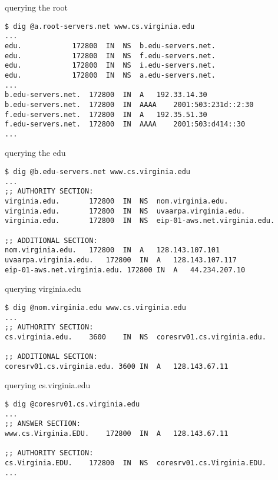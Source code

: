 
\begin{frame}[fragile]{querying the root}
\begin{Verbatim}[fontsize=\small]
$ dig @a.root-servers.net www.cs.virginia.edu
...
edu.			172800	IN	NS	b.edu-servers.net.
edu.			172800	IN	NS	f.edu-servers.net.
edu.			172800	IN	NS	i.edu-servers.net.
edu.			172800	IN	NS	a.edu-servers.net.
...
b.edu-servers.net.	172800	IN	A	192.33.14.30
b.edu-servers.net.	172800	IN	AAAA	2001:503:231d::2:30
f.edu-servers.net.	172800	IN	A	192.35.51.30
f.edu-servers.net.	172800	IN	AAAA	2001:503:d414::30
...
\end{Verbatim}
\end{frame}

\begin{frame}[fragile]{querying the edu}
\begin{Verbatim}[fontsize=\small]
$ dig @b.edu-servers.net www.cs.virginia.edu
...
;; AUTHORITY SECTION:
virginia.edu.		172800	IN	NS	nom.virginia.edu.
virginia.edu.		172800	IN	NS	uvaarpa.virginia.edu.
virginia.edu.		172800	IN	NS	eip-01-aws.net.virginia.edu.

;; ADDITIONAL SECTION:
nom.virginia.edu.	172800	IN	A	128.143.107.101
uvaarpa.virginia.edu.	172800	IN	A	128.143.107.117
eip-01-aws.net.virginia.edu. 172800 IN	A	44.234.207.10
\end{Verbatim}
\end{frame}
\begin{frame}[fragile]{querying virginia.edu}
\begin{Verbatim}[fontsize=\small]
$ dig @nom.virginia.edu www.cs.virginia.edu
...
;; AUTHORITY SECTION:
cs.virginia.edu.	3600	IN	NS	coresrv01.cs.virginia.edu.

;; ADDITIONAL SECTION:
coresrv01.cs.virginia.edu. 3600	IN	A	128.143.67.11
\end{Verbatim}
\end{frame}

\begin{frame}[fragile]{querying cs.virginia.edu}
\begin{Verbatim}[fontsize=\small]
$ dig @coresrv01.cs.virginia.edu
...
;; ANSWER SECTION:
www.cs.Virginia.EDU.	172800	IN	A	128.143.67.11

;; AUTHORITY SECTION:
cs.Virginia.EDU.	172800	IN	NS	coresrv01.cs.Virginia.EDU.
...
\end{Verbatim}
\end{frame}

